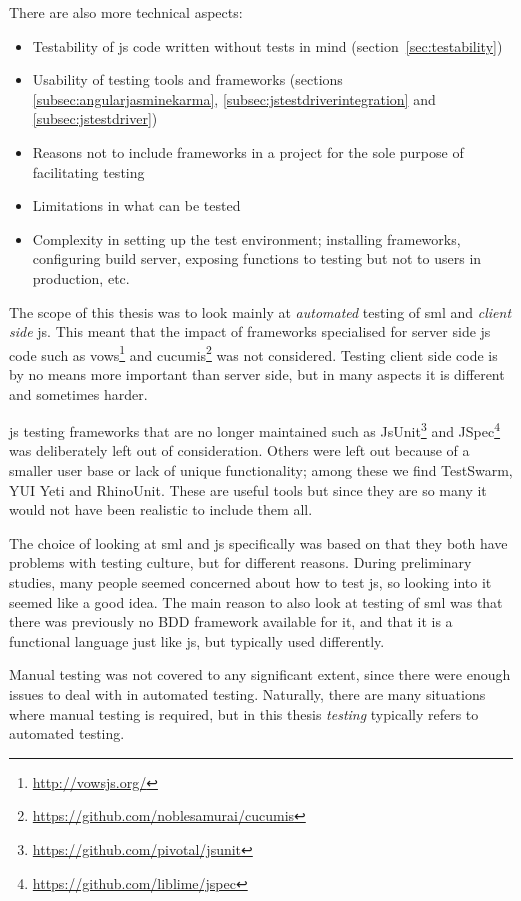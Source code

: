 \documentclass[11pt]{article}
\begin{document}
There are also more technical aspects:
\begin{itemize}[label={--}]
\item Testability of \gls{js} code written without tests in mind (section~\ref{sec:testability})
\item Usability of testing tools and frameworks (sections \ref{subsec:angularjasminekarma}, \ref{subsec:jstestdriverintegration} and \ref{subsec:jstestdriver})
\item Reasons not to include frameworks in a project for the sole purpose of facilitating testing
\item Limitations in what can be tested
\item Complexity in setting up the test environment; installing frameworks, configuring build server, exposing functions to testing but not to users in production, etc.
\end{itemize}

The scope of this thesis was to look mainly at \emph{automated} testing of \gls{sml} and \emph{client side} \gls{js}. This meant that the impact of frameworks specialised for server side \gls{js} code such as vows\footnote{\url{http://vowsjs.org/}} and cucumis\footnote{\url{https://github.com/noblesamurai/cucumis}} was not considered. Testing client side code is by no means more important than server side, but in many aspects it is different and sometimes harder.

\gls{js} testing frameworks that are no longer maintained such as JsUnit\footnote{\url{https://github.com/pivotal/jsunit}} and JSpec\footnote{\url{https://github.com/liblime/jspec}} was deliberately left out of consideration. Others were left out because of a smaller user base or lack of unique functionality; among these we find TestSwarm, YUI Yeti and RhinoUnit. These are useful tools but since they are so many it would not have been realistic to include them all.

The choice of looking at \gls{sml} and \gls{js} specifically was based on that they both have problems with testing culture, but for different reasons. During preliminary studies, many people seemed concerned about how to test \gls{js}, so looking into it seemed like a good idea. The main reason to also look at testing of \gls{sml} was that there was previously no BDD framework available for it, and that it is a functional language just like \gls{js}, but typically used differently.

Manual testing was not covered to any significant extent, since there were enough issues to deal with in automated testing. Naturally, there are many situations where manual testing is required, but in this thesis \emph{testing} typically refers to automated testing.
\end{document}
